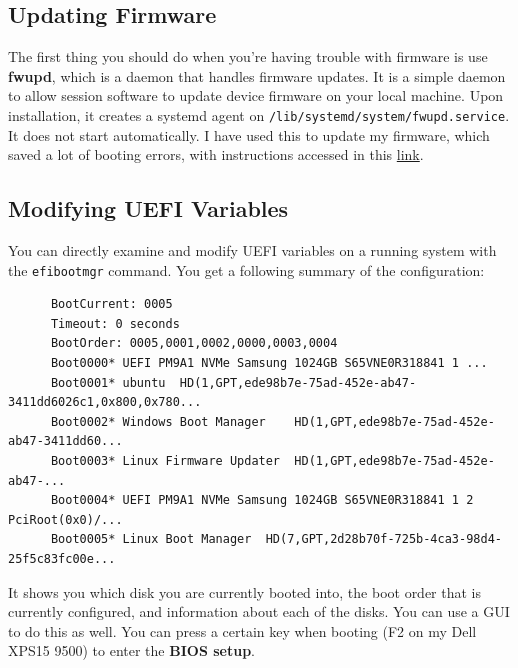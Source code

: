 \documentclass{article}
\begin{document}
  \subsection{Updating Firmware}

    The first thing you should do when you're having trouble with firmware is use \textbf{fwupd}, which is a daemon that handles firmware updates. It is a simple daemon to allow session software to update device firmware on your local machine. Upon installation, it creates a systemd agent on \texttt{/lib/systemd/system/fwupd.service}. It does not start automatically. I have used this to update my firmware, which saved a lot of booting errors, with instructions accessed in this \href{https://wiki.archlinux.org/title/fwupd}{link}. 

  \subsection{Modifying UEFI Variables}

    You can directly examine and modify UEFI variables on a running system with the \texttt{efibootmgr} command. You get a following summary of the configuration: 
    \begin{lstlisting}
      BootCurrent: 0005
      Timeout: 0 seconds
      BootOrder: 0005,0001,0002,0000,0003,0004
      Boot0000* UEFI PM9A1 NVMe Samsung 1024GB S65VNE0R318841 1	...
      Boot0001* ubuntu	HD(1,GPT,ede98b7e-75ad-452e-ab47-3411dd6026c1,0x800,0x780...
      Boot0002* Windows Boot Manager	HD(1,GPT,ede98b7e-75ad-452e-ab47-3411dd60...
      Boot0003* Linux Firmware Updater	HD(1,GPT,ede98b7e-75ad-452e-ab47-...
      Boot0004* UEFI PM9A1 NVMe Samsung 1024GB S65VNE0R318841 1 2	PciRoot(0x0)/...
      Boot0005* Linux Boot Manager	HD(7,GPT,2d28b70f-725b-4ca3-98d4-25f5c83fc00e...
    \end{lstlisting}

    It shows you which disk you are currently booted into, the boot order that is currently configured, and information about each of the disks. You can use a GUI to do this as well. You can press a certain key when booting (F2 on my Dell XPS15 9500) to enter the \textbf{BIOS setup}. 
\end{document}
